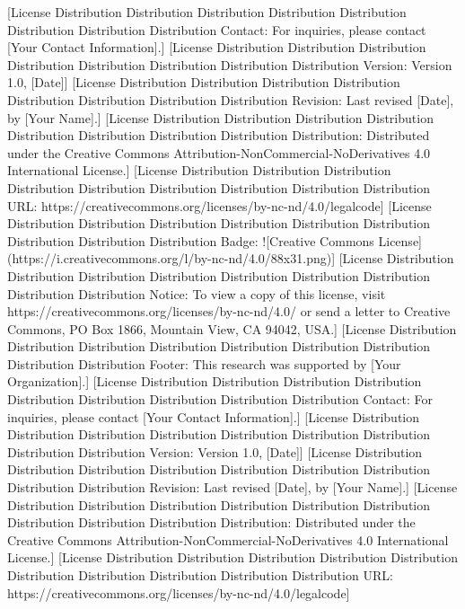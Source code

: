 [License Distribution Distribution Distribution Distribution Distribution Distribution Distribution Distribution Contact: For inquiries, please contact [Your Contact Information].]  
[License Distribution Distribution Distribution Distribution Distribution Distribution Distribution Distribution Version: Version 1.0, [Date]]  
[License Distribution Distribution Distribution Distribution Distribution Distribution Distribution Distribution Revision: Last revised [Date], by [Your Name].]  
[License Distribution Distribution Distribution Distribution Distribution Distribution Distribution Distribution Distribution: Distributed under the Creative Commons Attribution-NonCommercial-NoDerivatives 4.0 International License.]  
[License Distribution Distribution Distribution Distribution Distribution Distribution Distribution Distribution Distribution URL: https://creativecommons.org/licenses/by-nc-nd/4.0/legalcode]  
[License Distribution Distribution Distribution Distribution Distribution Distribution Distribution Distribution Distribution Badge: ![Creative Commons License](https://i.creativecommons.org/l/by-nc-nd/4.0/88x31.png)]  
[License Distribution Distribution Distribution Distribution Distribution Distribution Distribution Distribution Distribution Notice: To view a copy of this license, visit https://creativecommons.org/licenses/by-nc-nd/4.0/ or send a letter to Creative Commons, PO Box 1866, Mountain View, CA 94042, USA.]  
[License Distribution Distribution Distribution Distribution Distribution Distribution Distribution Distribution Distribution Footer: This research was supported by [Your Organization].]  
[License Distribution Distribution Distribution Distribution Distribution Distribution Distribution Distribution Distribution Contact: For inquiries, please contact [Your Contact Information].]  
[License Distribution Distribution Distribution Distribution Distribution Distribution Distribution Distribution Distribution Version: Version 1.0, [Date]]  
[License Distribution Distribution Distribution Distribution Distribution Distribution Distribution Distribution Distribution Revision: Last revised [Date], by [Your Name].]  
[License Distribution Distribution Distribution Distribution Distribution Distribution Distribution Distribution Distribution Distribution: Distributed under the Creative Commons Attribution-NonCommercial-NoDerivatives 4.0 International License.]  
[License Distribution Distribution Distribution Distribution Distribution Distribution Distribution Distribution Distribution Distribution URL: https://creativecommons.org/licenses/by-nc-nd/4.0/legalcode]  
